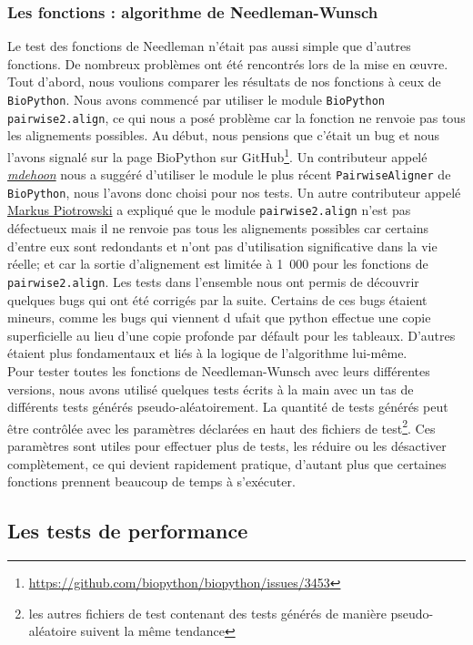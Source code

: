 \documentclass[12pt]{article}
\begin{document}
\subsubsection{Les fonctions : algorithme de Needleman-Wunsch}
Le test des fonctions de Needleman n'était pas aussi simple que d'autres fonctions. De nombreux problèmes ont été rencontrés lors de la mise en œuvre. Tout d'abord, nous voulions comparer les résultats de nos fonctions à ceux de \texttt{BioPython}. Nous avons commencé par utiliser le module \texttt{BioPython} \texttt{pairwise2.align}, ce qui nous a posé problème car la fonction ne renvoie pas tous les alignements possibles. Au début, nous pensions que c'était un bug et nous l'avons signalé sur la page BioPython sur GitHub\footnote{\url{https://github.com/biopython/biopython/issues/3453}}. Un contributeur appelé \href{https://github.com/mdehoon}{\textsl{mdehoon}} nous a suggéré d'utiliser le module le plus récent \texttt{PairwiseAligner} de \texttt{BioPython}, nous l'avons donc choisi pour nos tests. Un autre contributeur appelé \href{https://github.com/MarkusPiotrowski}{Markus Piotrowski} a expliqué que le module \texttt{pairwise2.align} n'est pas défectueux mais il ne renvoie pas tous les alignements possibles car certains d'entre eux sont redondants et n'ont pas d'utilisation significative dans la vie réelle; et car la sortie d'alignement est limitée à 1~000 pour les fonctions de \texttt{pairwise2.align}. Les tests dans l'ensemble nous ont permis de découvrir quelques bugs qui ont été corrigés par la suite. Certains de ces bugs étaient mineurs, comme les bugs qui viennent d ufait que python effectue une copie superficielle au lieu d'une copie profonde par défault pour les tableaux. D'autres étaient plus fondamentaux et liés à la logique de l'algorithme lui-même.\\
Pour tester toutes les fonctions de Needleman-Wunsch avec leurs différentes versions, nous avons utilisé quelques tests écrits à la main avec un tas de différents tests générés pseudo-aléatoirement. 
La quantité de tests générés peut être contrôlée avec les paramètres déclarées en haut des fichiers de test\footnote{les autres fichiers de test contenant des tests générés de manière pseudo-aléatoire suivent la même tendance}. Ces paramètres sont utiles pour effectuer plus de tests, les réduire ou les désactiver complètement, ce qui devient rapidement pratique, d'autant plus que certaines fonctions prennent beaucoup de temps à s'exécuter.



\subsection{Les tests de performance}
\end{document}

